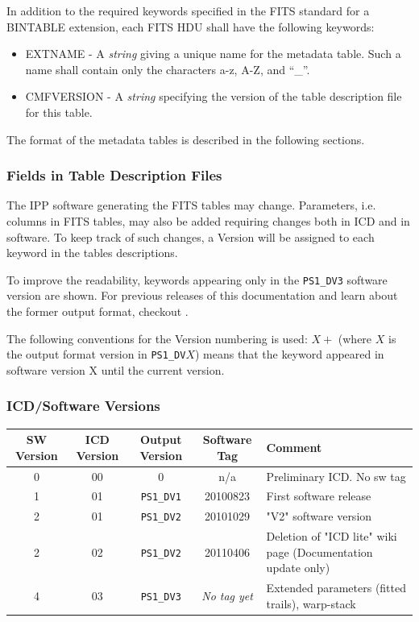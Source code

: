 \documentclass[panstarrs,spec]{panstarrs}
\newcommand{\outformatversion}{%
  \texttt{PS1\_DV3}}
\begin{document}
In addition to the required keywords specified in the FITS standard
for a BINTABLE extension, each FITS HDU shall have the following
keywords:

\begin{itemize}
\item{EXTNAME} - A \emph{string} giving a unique name for the metadata
  table. Such a name shall contain only the characters a-z, A-Z, and
  ``\_''.
\item{CMFVERSION} - A \emph{string} specifying the version of the
  table description file for this table.
\end{itemize}

The format of the metadata tables is described in the following sections.

\subsubsection{Fields in Table Description Files}

The IPP software generating the FITS tables may change. Parameters,
i.e. columns in FITS tables, may also be added requiring changes both
in ICD and in software. To keep track of such changes, a Version will
be assigned to each keyword in the tables descriptions.

To improve the readability, keywords appearing only in the
\outformatversion{} software version are shown. For previous releases
of this documentation and learn about the former output format,
checkout .

The following conventions for the Version numbering is used: $X+$
(where $X$ is the output format version in \texttt{PS1\_DV$X$}) means
that the keyword appeared in software version X until the current
version.

\subsubsection{ICD/Software Versions}

\begin{tabular}{|c|c|c|c|p{3in}|}
  \hline
  SW Version & ICD Version & Output Version & Software Tag & Comment \\
  \hline
  0 & 00 & 0 & n/a & Preliminary ICD. No sw tag \\
  1 & 01 & \texttt{PS1\_DV1} & 20100823 & First software release \\
  2 & 01 & \texttt{PS1\_DV2} & 20101029 & "V2" software version \\
  2 & 02 & \texttt{PS1\_DV2} & 20110406 & Deletion of "ICD lite" wiki page (Documentation update only)\\
  4 & 03 & \texttt{PS1\_DV3} & \emph{No tag yet} &  Extended parameters (fitted trails), warp-stack\\
  \hline
\end{tabular}
\end{document}
